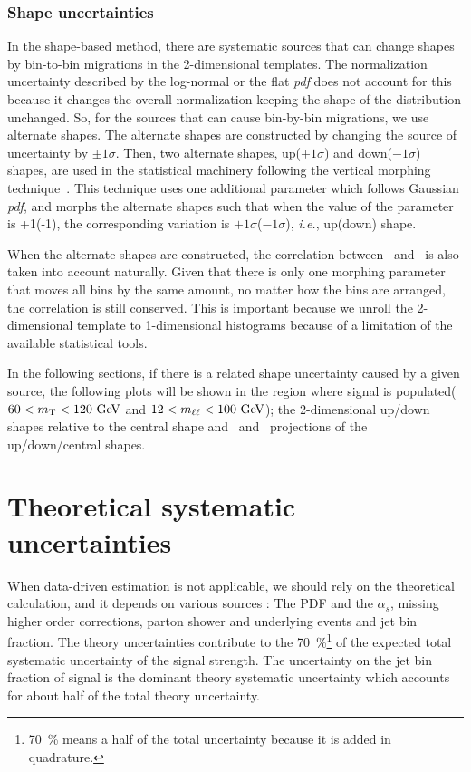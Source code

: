 \subsubsection{Shape uncertainties}

In the shape-based method, there are systematic sources that can change shapes 
by bin-to-bin migrations in the 2-dimensional templates. 
The normalization uncertainty described by the log-normal or the flat \textit{pdf}  
does not account for this because it changes the overall normalization 
keeping the shape of the distribution unchanged. So, for the sources that can cause 
bin-by-bin migrations, we use alternate shapes.  
The alternate shapes are constructed by changing the source of uncertainty 
by $\pm 1\sigma$. Then, two alternate shapes, up($+1\sigma$) and down($-1\sigma$) shapes,
are used in the statistical machinery following the vertical morphing 
technique~\cite{2011arXiv1103.0354C}. 
This technique uses one additional parameter which follows Gaussian \textit{pdf},
and morphs the alternate shapes such that when the value of the parameter 
is +1(-1), the corresponding variation is $+1\sigma$($-1\sigma$), 
\textit{i.e.}, up(down) shape. 

When the alternate shapes are constructed, 
the correlation between \mT\ and \mll\ is also taken into account naturally.  
Given that there is only one morphing parameter that moves all bins 
by the same amount,  
no matter how the bins are arranged, the correlation is still conserved.  
This is important because we unroll the 2-dimensional template to 1-dimensional 
histograms because of a limitation of the available statistical tools. 

In the following sections, if there is a related shape uncertainty
caused by a given source, the following plots will be shown 
in the region where signal is populated($60<m_{\mathrm{T}}<120~\mathrm{Ge\kern -0.1em V}$ and $12<m_{\ell\ell}<100~\mathrm{Ge\kern -0.1em V}$); 
the 2-dimensional up/down shapes relative to the central shape 
and \mT\ and \mll\ projections of the up/down/central shapes. 

\section{Theoretical systematic uncertainties}

When data-driven estimation is not applicable, we should rely on the theoretical 
calculation, and it depends on various sources : The PDF and the $\alpha_s$,  
missing higher order corrections, parton shower and underlying events 
and jet bin fraction. The theory uncertainties contribute to the 70~\%\footnote{70~\% means a half 
of the total uncertainty because it is added in quadrature.} of 
the expected total systematic uncertainty of the signal strength. 
The uncertainty on the jet bin fraction of signal is the dominant theory systematic
uncertainty which accounts for about half of the total theory uncertainty.

